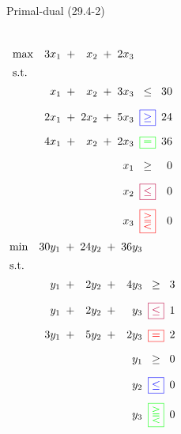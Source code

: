 \begin{frame}{Primal-dual (29.4-2)}
  \begin{columns}
	  \begin{equation*}
		\setlength\arraycolsep{2.5pt}
		\begin{array}{l@{\quad}rcrcrcr}
		  \max 	& 3x_1  &+&	x_2		&+&	2x_3	&	&	\\[5pt]
		  \text{s.t.} 	&	&	&	&	&	&	&	\\[5pt]
				& x_1   &+&	x_2		&+&	3x_3	&\leq& 30 \\[10pt]
				& 2x_1	&+&	2x_2 	&+& 5x_3 	&\bbox{\geq}& 24 \\[10pt]
				& 4x_1  &+&	x_2		&+&	2x_3	&\gbox{=}& 36	\\[10pt]
				& &&	&&	x_1 &\geq&	0	\\[10pt]
				& &&	&&	x_2 &\pbox{\leq}&	0	\\[10pt]
				& &&	&&	x_3 &\rbox{\gtreqqless} &	0
		\end{array}
	  \end{equation*}
	  \begin{equation*}
		\setlength\arraycolsep{2.5pt}
		\begin{array}{l@{\quad}rcrcrcr}
		  \min 	& 30y_1  &+&	24y_2		&+&	36y_3	&	&	\\[5pt]
		  \text{s.t.} 	&	&	&	&	&	&	&	\\[5pt]
				& y_1   &+&	2y_2	&+&	4y_3	&\geq& 3 \\[10pt]
				& y_1	&+&	2y_2 	&+& y_3 	&\pbox{\leq}& 1 \\[10pt]
				& 3y_1  &+&	5y_2	&+&	2y_3	&\rbox{=}& 2	\\[10pt]
				& &&	&&	y_1 &\geq&	0	\\[10pt]
				& &&	&&	y_2 &\bbox{\leq}&	0	\\[10pt]
				& &&	&&  y_3 &\gbox{\gtreqqless}	&	0
		\end{array}
	  \end{equation*}
  \end{columns}
\end{frame}
